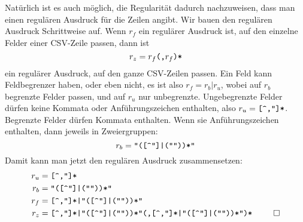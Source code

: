 \begin{loesung}
Natürlich ist es auch möglich, die Regularität dadurch nachzuweisen,
dass man einen regulären Ausdruck für die Zeilen angibt. Wir bauen
den regulären Ausdruck Schrittweise auf. Wenn $r_f$ ein regulärer Ausdruck
ist, auf den einzelne Felder einer CSV-Zeile passen, dann ist
\[
r_z=r_f\text{\tt (,}r_f\text{\tt )*}
\]
ein regulärer Ausdruck, auf den ganze CSV-Zeilen passen. Ein Feld kann
Feldbegrenzer haben, oder eben nicht, es ist also $r_f=r_b|r_u$, wobei
auf $r_b$ begrenzte Felder passen, und auf $r_u$ nur unbegrenzte.
Ungebegrenzte Felder dürfen keine Kommata oder Anführungszeichen
enthalten, also $r_u=\text{\tt [\char94,\char34]*}$. Begrenzte Felder
dürfen Kommata enthalten. Wenn sie Anführungszeichen enthalten,
dann jeweils in Zweiergruppen:
\[
r_b=\text{\tt
\char34([\char94\char34]|(\char34\char34))*\char34
}
\]
Damit kann man jetzt den regulären Ausdruck zusammensetzen:
\begin{align*}
r_u&=\text{\tt
[\char94,\char34]*
}\\
r_b&=\text{\tt
\char34([\char94\char34]|(\char34\char34))*\char34
}\\
r_f&=\text{\tt
[\char94,\char34]*|\char34([\char94\char34]|(\char34\char34))*\char34
}\\
r_z&=\text{\tt
[\char94,\char34]*|\char34([\char94\char34]|(\char34\char34))*\char34
(,%
[\char94,\char34]*|\char34([\char94\char34]|(\char34\char34))*\char34
)*
}
\qedhere
\end{align*}
\end{loesung}
